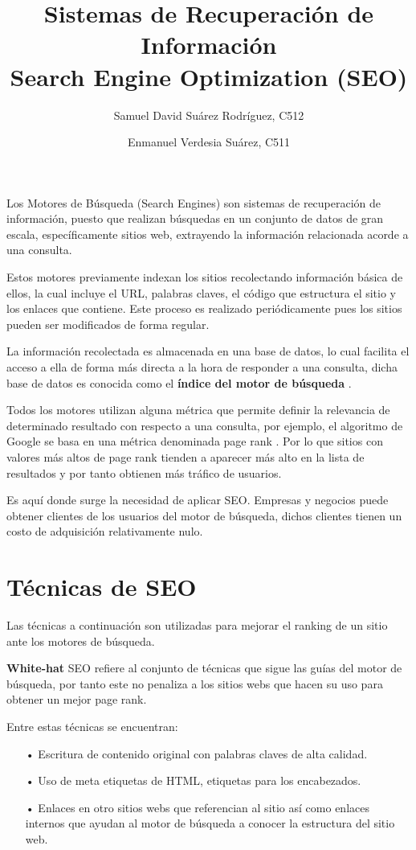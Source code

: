 \documentclass[12pt]{article}
\title{Sistemas de Recuperación de Información \\ Search Engine Optimization (SEO)}
\author{
    Samuel David Suárez Rodríguez, C512 \and
    Enmanuel Verdesia Suárez, C511
}
\date{}
\begin{document}
\maketitle

Los Motores de Búsqueda (Search Engines) son sistemas de recuperación de información, puesto que realizan búsquedas en un conjunto de datos de gran escala, específicamente sitios web, extrayendo la información relacionada acorde a una consulta.

Estos motores previamente indexan los sitios recolectando información básica de ellos, la cual incluye el URL, palabras claves, el código que estructura el sitio y los enlaces que contiene. Este proceso es realizado periódicamente pues los sitios pueden ser modificados de forma regular.

La información recolectada es almacenada en una base de datos, lo cual facilita el acceso a ella de forma más directa a la hora de responder a una consulta, dicha base de datos es conocida como el \textbf{índice del motor de búsqueda} \cite{what_is_seo}.

Todos los motores utilizan alguna métrica que permite definir la relevancia de determinado resultado con respecto a una consulta, por ejemplo, el algoritmo de Google se basa en una métrica denominada page rank \cite{pr}. Por lo que sitios con valores más altos de page rank tienden a aparecer más alto en la lista de resultados y por tanto obtienen más tráfico de usuarios.

Es aquí donde surge la necesidad de aplicar SEO. Empresas y negocios puede obtener clientes de los usuarios del motor de búsqueda, dichos clientes tienen un costo de adquisición relativamente nulo.

\section{Técnicas de SEO}
Las técnicas a continuación son utilizadas para mejorar el ranking de un sitio ante los motores de búsqueda.

\textbf{White-hat} SEO refiere al conjunto de técnicas que sigue las guías del motor de búsqueda, por tanto este no penaliza a los sitios webs que hacen su uso para obtener un mejor page rank.

Entre estas técnicas se encuentran:
\begin{itemize}
    \item[•] Escritura de contenido original con palabras claves de alta calidad.
    \item[•] Uso de meta etiquetas de HTML, etiquetas para los encabezados.
    \item[•] Enlaces en otro sitios webs que referencian al sitio así como enlaces internos que ayudan al motor de búsqueda a conocer la estructura del sitio web.
\end{itemize}
\end{document}
